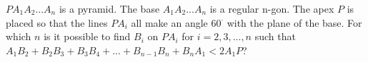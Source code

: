 $PA_1A_2...A_n$ is a pyramid. The base $A_1A_2...A_n$ is a regular n-gon. The apex $P$ is placed so that the lines $PA_i$ all make an angle $60^{\cdot}$ with the plane of the base. For which $n$ is it possible to find $B_i$ on $PA_i$ for $i = 2, 3, ... , n$ such that $A_1B_2 + B_2B_3 + B_3B_4 + ... + B_{n-1}B_n + B_nA_1 < 2A_1P$?